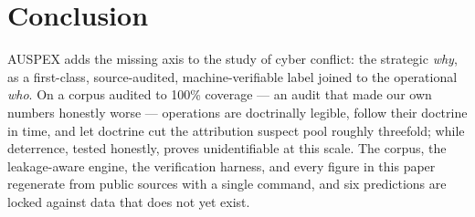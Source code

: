 \documentclass[11pt]{article}
\begin{document}
\section{Conclusion}

AUSPEX adds the missing axis to the study of cyber conflict: the strategic \emph{why}, as a
first-class, source-audited, machine-verifiable label joined to the operational \emph{who}. On a
corpus audited to 100\% coverage --- an audit that made our own numbers honestly worse --- operations
are doctrinally legible, follow their doctrine in time, and let doctrine cut the attribution suspect
pool roughly threefold; while deterrence, tested honestly, proves unidentifiable at this scale. The
corpus, the leakage-aware engine, the verification harness, and every figure in this paper regenerate
from public sources with a single command, and six predictions are locked against data that does not
yet exist.

\small


\end{document}
